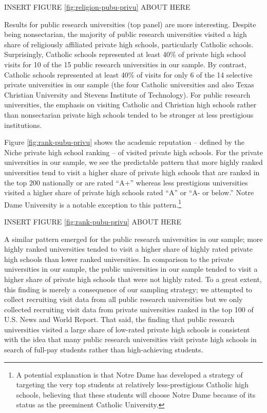 \documentclass[
  12pt,
]{article}
\begin{document}
INSERT FIGURE \ref{fig:religion-pubu-privu} ABOUT HERE

Results for public research universities (top panel) are more interesting. Despite being nonsectarian, the majority of public research universities visited a high share of religiously affiliated private high schools, particularly Catholic schools. Surprisingly, Catholic schools represented at least 40\% of private high school visits for 10 of the 15 public research universities in our sample. By contrast, Catholic schools represented at least 40\% of visits for only 6 of the 14 selective private universities in our sample (the four Catholic universities and also Texas Christian University and Stevens Institute of Technology). For public research universities, the emphasis on visiting Catholic and Christian high schools rather than nonsectarian private high schools tended to be stronger at less prestigious institutions.

Figure \ref{fig:rank-pubu-privu} shows the academic reputation -- defined by the Niche private high school ranking -- of visited private high schools. For the private universities in our sample, we see the predictable pattern that more highly ranked universities tend to visit a higher share of private high schools that are ranked in the top 200 nationally or are rated ``A+'' whereas less prestigious universities visited a higher share of private high schools rated ``A'' or ``A- or below.'' Notre Dame University is a notable exception to this pattern.\footnote{A potential explanation is that Notre Dame has developed a strategy of targeting the very top students at relatively less-prestigious Catholic high schools, believing that these students will choose Notre Dame because of its status as the preeminent Catholic University.}

INSERT FIGURE \ref{fig:rank-pubu-privu} ABOUT HERE

A similar pattern emerged for the public research universities in our sample; more highly ranked universities tended to visit a higher share of highly rated private high schools than lower ranked universities. In comparison to the private universities in our sample, the public universities in our sample tended to visit a higher share of private high schools that were not highly rated. To a great extent, this finding is merely a consequence of our sampling strategy; we attempted to collect recruiting visit data from all public research universities but we only collected recruiting visit data from private universities ranked in the top 100 of U.S. News and World Report. That said, the finding that public research universities visited a large share of low-rated private high schools is consistent with the idea that many public research universities visit private high schools in search of full-pay students rather than high-achieving students.
\end{document}
